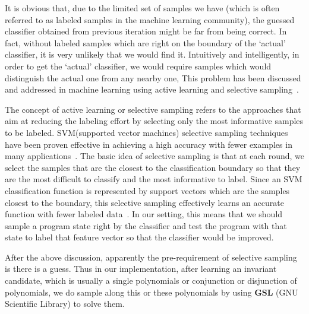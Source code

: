 It is obvious that, due to the limited set of samples we have (which is often referred to as labeled samples in the machine learning community), 
the guessed classifier obtained from previous iteration might be far from being correct. 
In fact, without labeled samples which are right on the boundary of the `actual' classifier, 
it is very unlikely that we would find it. 
Intuitively and intelligently, in order to get the `actual' classifier, 
we would require samples which would distinguish the actual one from any nearby one, 
This problem has been discussed and addressed in machine learning using active learning and selective sampling~\cite{DBLP:conf/icml/SchohnC00}.

The concept of active learning or selective sampling refers to the approaches 
that aim at reducing the labeling effort by selecting only the most informative samples to be labeled. 
SVM(supported vector machines) selective sampling techniques have been proven effective in achieving a high accuracy 
with fewer examples in many applications~\cite{DBLP:conf/mm/TongC01,DBLP:journals/jmlr/TongK01}. 
The basic idea of selective sampling is that at each round, we select the samples that are the closest to the classification boundary 
so that they are the most difficult to classify and the most informative to label. 
Since an SVM classification function is represented by support vectors which are the samples closest to the boundary, 
this selective sampling effectively learns an accurate function with fewer labeled data~\cite{DBLP:conf/icml/SchohnC00}. 
In our setting, this means that we should sample a program state right by the classifier and test the program 
with that state to label that feature vector so that the classifier would be improved.


After the above discussion, apparently the pre-requirement of selective sampling is there is a guess.
Thus in our implementation, after learning an invariant candidate, 
which is usually a single polynomials or conjunction or disjunction of polynomials,
we do sample along this or these polynomials by using \textbf{GSL} (GNU Scientific Library) to solve them.

